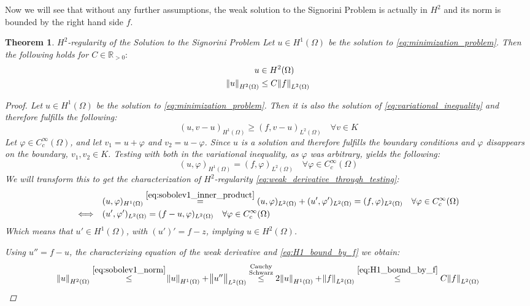 \documentclass[headsepline,footsepline,footinclude=false,oneside,fontsize=11pt,paper=a4,listof=totoc,bibliography=totoc]{scrbook} %
\newtheorem{theorem}{Theorem}
\begin{document}
Now we will see that without any further assumptions, the weak solution to the Signorini Problem is actually in $H^2$ and its norm is bounded by the right hand side $f$.

\begin{theorem} $H^2$-regularity of the Solution to the Signorini Problem \newline
	Let $u \in H^1(\Omega)$ be the solution to \eqref{eq:minimization_problem}. Then the following holds for $C \in \mathbb{R}_{>0}:$
	\begin{align}
		u &\in H^2(\Omega) \label{eq:H2_regularity} \\
		\norm{u}_{H^2(\Omega)} &\leq C\norm{f}_{L^2(\Omega)} \label{eq:H2_norm_bound_by_f} 
	\end{align}
	\begin{proof}
		Let $u \in H^1(\Omega)$ be the solution to \eqref{eq:minimization_problem}. Then it is also the solution of \eqref{eq:variational_inequality} and therefore fulfills the following:
		\begin{equation*}
		(u,v-u)_{H^1(\Omega)} \geq (f,v-u)_{L^2(\Omega)} \quad \forall v \in K
		\end{equation*}
		Let $\varphi \in C_c^\infty(\Omega)$, and let $v_1 = u + \varphi$ and $v_2 = u - \varphi$. Since $u$ is a solution and therefore fulfills the boundary conditions and $\varphi$ disappears on the boundary, $v_1,v_2 \in K$. Testing with both in the variational inequality, as $\varphi$ was arbitrary, yields the following:
		\begin{equation*}
			(u, \varphi)_{H^1(\Omega)} = (f, \varphi)_{L^2(\Omega)} \quad \forall \varphi \in C_c^\infty(\Omega)
		\end{equation*}
		We will transform this to get the characterization of $H^2$-regularity \eqref{eq:weak_derivative_through_testing}:
		\begin{align*}
		&(u,\varphi)_{H^1(\Omega)} \overset{\eqref{eq:sobolev1_inner_product}}{=} (u,\varphi)_{L^2(\Omega)} + (u',\varphi')_{L^2(\Omega)} = (f, \varphi)_{L^2(\Omega)} \quad \forall \varphi \in C_c^\infty(\Omega) \\
		\Longleftrightarrow \quad &(u',\varphi')_{L^2(\Omega)} = (f-u,\varphi)_{L^2(\Omega)} \quad \forall \varphi \in C_c^\infty(\Omega)
		\end{align*}
		Which means that $u' \in H^1(\Omega)$, with $(u')' = f-z$, implying $u \in H^2(\Omega)$.
		
		Using $u'' = f-u$, the characterizing equation of the weak derivative and \eqref{eq:H1_bound_by_f} we obtain:
		\begin{align*}
			\norm{u}_{H^2(\Omega)}\overset{\eqref{eq:sobolev1_norm}}{\leq} \norm{u}_{H^1(\Omega)} + \norm{u''}_{L^2(\Omega)} 
			\overset{\substack{\text{Cauchy} \\ \text{Schwarz}}}{\leq} 2\norm{u}_{H^1(\Omega)} + \norm{f}_{L^2(\Omega)} 
			\overset{\eqref{eq:H1_bound_by_f}}{\leq} C \norm{f}_{L^2(\Omega)}
		\end{align*}
	\end{proof}
\end{theorem}
\end{document}

